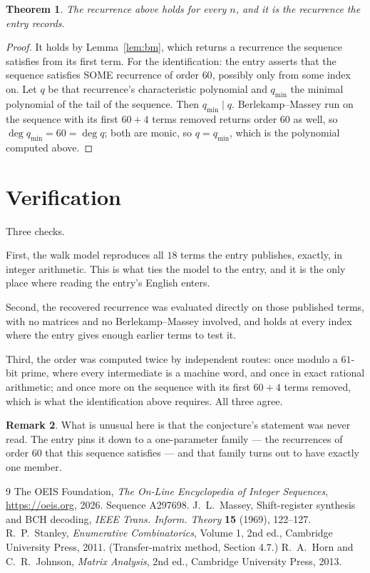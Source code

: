 \documentclass[11pt,a4paper]{article}
\theoremstyle{plain}
\newtheorem{theorem}{Theorem}
\theoremstyle{definition}
\newtheorem{remark}[theorem]{Remark}
\begin{document}
\begin{theorem}
The recurrence above holds for every $n$, and it is the recurrence the entry records.
\end{theorem}

\begin{proof}
It holds by Lemma~\ref{lem:bm}, which returns a recurrence the sequence satisfies from its
first term. For the identification: the entry asserts that the sequence satisfies SOME
recurrence of order $60$, possibly only from some index on. Let $q$ be that recurrence's
characteristic polynomial and $q_{\min}$ the minimal polynomial of the tail of the sequence.
Then $q_{\min}\mid q$. Berlekamp--Massey run on the sequence with its first $60+4$ terms
removed returns order $60$ as well, so $\deg q_{\min}=60=\deg q$; both are monic, so
$q=q_{\min}$, which is the polynomial computed above.
\end{proof}

\section{Verification}

Three checks.

First, the walk model reproduces all $18$ terms the entry publishes, exactly, in integer
arithmetic. This is what ties the model to the entry, and it is the only place where reading
the entry's English enters.

Second, the recovered recurrence was evaluated directly on those published terms, with no
matrices and no Berlekamp--Massey involved, and holds at every index where the entry gives
enough earlier terms to test it.

Third, the order was computed twice by independent routes: once modulo a $61$-bit prime, where
every intermediate is a machine word, and once in exact rational arithmetic; and once more on
the sequence with its first $60+4$ terms removed, which is what the identification above
requires. All three agree.

\begin{remark}
What is unusual here is that the conjecture's statement was never read. The entry pins it down
to a one-parameter family --- the recurrences of order $60$ that this sequence satisfies
--- and that family turns out to have exactly one member.
\end{remark}

\begin{thebibliography}{9}
 The OEIS Foundation, \emph{The On-Line Encyclopedia of Integer
Sequences}, \url{https://oeis.org}, 2026. Sequence A297698.
 J.~L.~Massey, Shift-register synthesis and BCH decoding, \emph{IEEE
Trans. Inform. Theory} \textbf{15} (1969), 122--127.
 R.~P.~Stanley, \emph{Enumerative Combinatorics}, Volume 1, 2nd ed.,
Cambridge University Press, 2011. (Transfer-matrix method, Section 4.7.)
 R.~A.~Horn and C.~R.~Johnson, \emph{Matrix Analysis}, 2nd ed., Cambridge
University Press, 2013.
\end{thebibliography}
\end{document}
